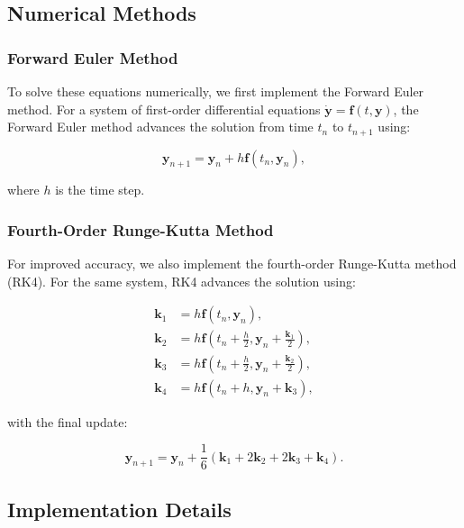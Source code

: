 \documentclass[english,notitlepage,reprint,nofootinbib]{revtex4-2}  %
\begin{document}
\subsection{Numerical Methods}

\subsubsection{Forward Euler Method}

To solve these equations numerically, we first implement the Forward Euler method. For a system of first-order differential equations $\dot{\mathbf{y}} = \mathbf{f}(t, \mathbf{y})$, the Forward Euler method advances the solution from time $t_n$ to $t_{n+1}$ using:

\begin{equation}
    \mathbf{y}_{n+1} = \mathbf{y}_n + h\mathbf{f}(t_n, \mathbf{y}_n),
\end{equation}

where $h$ is the time step.

\subsubsection{Fourth-Order Runge-Kutta Method}

For improved accuracy, we also implement the fourth-order Runge-Kutta method (RK4). For the same system, RK4 advances the solution using:

\begin{align}
    \mathbf{k}_1 &= h\mathbf{f}(t_n, \mathbf{y}_n), \\
    \mathbf{k}_2 &= h\mathbf{f}(t_n + \frac{h}{2}, \mathbf{y}_n + \frac{\mathbf{k}_1}{2}), \\
    \mathbf{k}_3 &= h\mathbf{f}(t_n + \frac{h}{2}, \mathbf{y}_n + \frac{\mathbf{k}_2}{2}), \\
    \mathbf{k}_4 &= h\mathbf{f}(t_n + h, \mathbf{y}_n + \mathbf{k}_3),
\end{align}

with the final update:

\begin{equation}
    \mathbf{y}_{n+1} = \mathbf{y}_n + \frac{1}{6}(\mathbf{k}_1 + 2\mathbf{k}_2 + 2\mathbf{k}_3 + \mathbf{k}_4).
\end{equation}

\subsection{Implementation Details}
\end{document}
